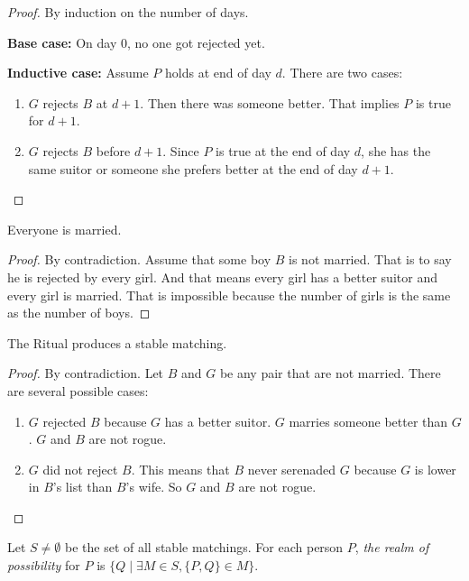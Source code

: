 \documentclass[11pt]{article}
\begin{document}
\begin{proof}
By induction on the number of days.

\textbf{Base case:}  On day $0$, no one got rejected yet.

\textbf{Inductive case:} Assume $P$ holds at end of day $d$. There are two cases:
\begin{enumerate}
\item $G$ rejects $B$ at $d+1$. Then there was someone better. That implies $P$ is true for $d+1$.
\item $G$ rejects $B$ before $d+1$. Since $P$ is true at the end of day $d$, she has the same suitor
or someone she prefers better at the end of day $d+1$.
\end{enumerate}
\end{proof}

\begin{theorem}
Everyone is married.
\end{theorem}

\begin{proof}
By contradiction. Assume that some boy $B$ is not married. That is to say he is rejected by every
girl. And that means every girl has a better suitor and every girl is married. That is impossible
because the number of girls is the same as the number of boys.
\end{proof}

\begin{theorem}
The Ritual produces a stable matching.
\end{theorem}

\begin{proof}
By contradiction. Let $B$ and $G$ be any pair that are not married. There are several possible cases:
\begin{enumerate}
\item $G$ rejected $B$ because $G$ has a better suitor. $G$ marries someone better than $G$. $G$ and
$B$ are not rogue.
\item $G$ did not reject $B$. This means that $B$ never serenaded $G$ because $G$ is lower in $B$'s
list than $B$'s wife. So $G$ and $B$ are not rogue.
\end{enumerate}
\end{proof}

\begin{definition}
Let $S \neq \emptyset$ be the set of all stable matchings. For each person $P$, \emph{the realm of
possibility} for $P$ is $\{Q \mid \exists M \in S,\{P,Q\} \in M\}$.
\end{definition}
\end{document}
